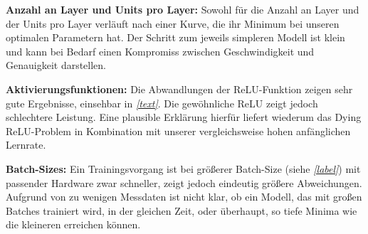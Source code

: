 \textbf{Anzahl an Layer und Units pro Layer:} %
Sowohl für die Anzahl an Layer und der Units pro Layer verläuft nach einer Kurve, die ihr Minimum bei unseren optimalen Parametern hat. Der Schritt zum jeweils simpleren Modell ist klein und kann bei Bedarf einen Kompromiss zwischen Geschwindigkeit und Genauigkeit darstellen. 

\textbf{Aktivierungsfunktionen:} %
Die Abwandlungen der ReLU-Funktion zeigen sehr gute Ergebnisse, einsehbar in \textit{\autoref{text}}. Die gewöhnliche ReLU zeigt jedoch schlechtere Leistung. Eine plausible Erklärung hierfür liefert wiederum das \grqq Dying ReLU\grqq-Problem in Kombination mit unserer vergleichsweise hohen anfänglichen Lernrate.  

\textbf{Batch-Sizes:}
Ein Trainingsvorgang ist bei größerer Batch-Size (siehe \textit{\autoref{label}}) mit passender Hardware zwar schneller, zeigt jedoch eindeutig größere Abweichungen. Aufgrund von zu wenigen Messdaten ist nicht klar, ob ein Modell, das mit großen Batches trainiert wird, in der gleichen Zeit, oder überhaupt, so tiefe Minima wie die kleineren erreichen können. 

